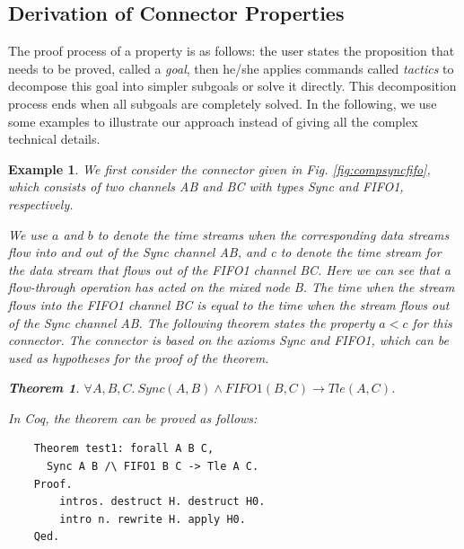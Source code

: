 \documentclass[3p,times]{elsarticle}
\newtheorem{example}{Example}[section]
\newtheorem{theorem}{Theorem}[section]
\begin{document}
\subsection{Derivation of Connector Properties}
The proof process of a property is as follows: the user states the proposition that needs to be proved, called a \emph{goal},
then he/she applies commands called \emph{tactics} to decompose this goal into simpler subgoals or solve it directly. This decomposition
process ends when all subgoals are completely solved. In the following, we use some examples to illustrate our approach instead of
giving all the complex technical details.
\begin{example}
We first consider the connector given in Fig. \ref{fig:compsyncfifo}, which consists of two channels \emph{AB} and \emph{BC} with types Sync and FIFO1, respectively.

We use $a$ and $b$ to denote the time streams when the corresponding data streams flow into and out of the Sync channel \emph{AB}, and
\emph{c} to denote the time stream for the data stream that flows out of the FIFO1 channel \emph{BC}. Here we can see that a flow-through
operation has acted on the mixed node \emph{B}. The time when the stream flows into the FIFO1 channel \emph{BC} is equal to the time when the
stream flows out of the Sync channel \emph{AB}. The following theorem states the property $a < c$ for this connector. The connector is based on the
axioms Sync and FIFO1, which can be used as hypotheses for the proof of the theorem.
\begin{theorem}\label{the:tleac}
$\forall A,B,C.\:Sync(A,B)\land FIFO1(B,C) \rightarrow Tle(A,C)$.
\end{theorem}

In Coq, the theorem can be proved as follows:
\begin{verbatim}
    Theorem test1: forall A B C,
      Sync A B /\ FIFO1 B C -> Tle A C.
    Proof.
        intros. destruct H. destruct H0.
        intro n. rewrite H. apply H0.
    Qed.
\end{verbatim}


\end{example}
\end{document}
